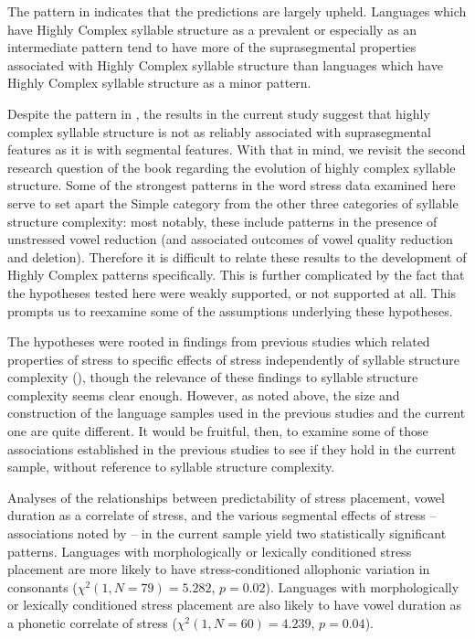   The pattern in  indicates that the predictions are largely upheld. Languages which have Highly Complex syllable structure as a prevalent or especially as an intermediate pattern tend to have more of the suprasegmental properties associated with Highly Complex syllable structure than languages which have Highly Complex syllable structure as a minor pattern.

  Despite the pattern in , the results in the current study suggest that highly complex syllable structure is not as reliably associated with suprasegmental features as it is with segmental features. With that in mind, we revisit the second research question of the book regarding the evolution of highly complex syllable structure. Some of the strongest patterns in the word stress data examined here serve to set apart the Simple category from the other three categories of syllable structure complexity: most notably, these include patterns in the presence of unstressed vowel reduction (and associated outcomes of vowel quality reduction and deletion). Therefore it is difficult to relate these results to the development of Highly Complex patterns specifically. This is further complicated by the fact that the hypotheses tested here were weakly supported, or not supported at all. This prompts us to reexamine some of the assumptions underlying these hypotheses.

  The hypotheses were rooted in findings from previous studies which related properties of stress to specific effects of stress independently of syllable structure complexity (\citealt{BybeeEtAl1998,Schiering2007}), though the relevance of these findings to syllable structure complexity seems clear enough. However, as noted above, the size and construction of the language samples used in the previous studies and the current one are quite different. It would be fruitful, then, to examine some of those associations established in the previous studies to see if they hold in the current sample, without reference to syllable structure complexity.

  Analyses of the relationships between predictability of stress placement, vowel duration as a correlate of stress, and the various segmental effects of stress -- associations noted by \citet{BybeeEtAl1998} -- in the current sample yield two statistically significant patterns. Languages with morphologically or lexically conditioned stress placement are more likely to have stress-conditioned allophonic variation in consonants ($\chi^2(1,N = 79) = 5.282$, $p = 0.02$). Languages with morphologically or lexically conditioned stress placement are also likely to have vowel duration as a phonetic correlate of stress ($\chi^2(1, N = 60) = 4.239$, $p = 0.04$).

